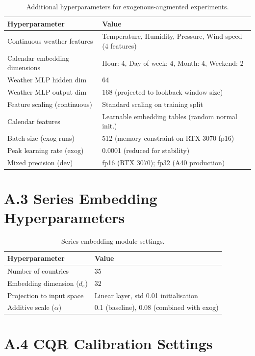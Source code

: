 \begin{table}[H]
\centering
\caption{Additional hyperparameters for exogenous-augmented experiments.}
\label{tab:exog_hparams}
\begin{tabular}{ll}
\toprule
\textbf{Hyperparameter} & \textbf{Value} \\
\midrule
Continuous weather features & Temperature, Humidity, Pressure, Wind speed (4 features) \\
Calendar embedding dimensions & Hour: 4, Day-of-week: 4, Month: 4, Weekend: 2 \\
Weather MLP hidden dim & 64 \\
Weather MLP output dim & 168 (projected to lookback window size) \\
Feature scaling (continuous) & Standard scaling on training split \\
Calendar features & Learnable embedding tables (random normal init.) \\
Batch size (exog runs) & 512 (memory constraint on RTX 3070 fp16) \\
Peak learning rate (exog) & 0.0001 (reduced for stability) \\
Mixed precision (dev) & fp16 (RTX 3070); fp32 (A40 production) \\
\bottomrule
\end{tabular}
\end{table}

\section*{A.3 Series Embedding Hyperparameters}

\begin{table}[H]
\centering
\caption{Series embedding module settings.}
\label{tab:embed_hparams}
\begin{tabular}{ll}
\toprule
\textbf{Hyperparameter} & \textbf{Value} \\
\midrule
Number of countries     & 35 \\
Embedding dimension ($d_e$) & 32 \\
Projection to input space & Linear layer, std 0.01 initialisation \\
Additive scale ($\alpha$) & 0.1 (baseline), 0.08 (combined with exog) \\
\bottomrule
\end{tabular}
\end{table}

\section*{A.4 CQR Calibration Settings}


